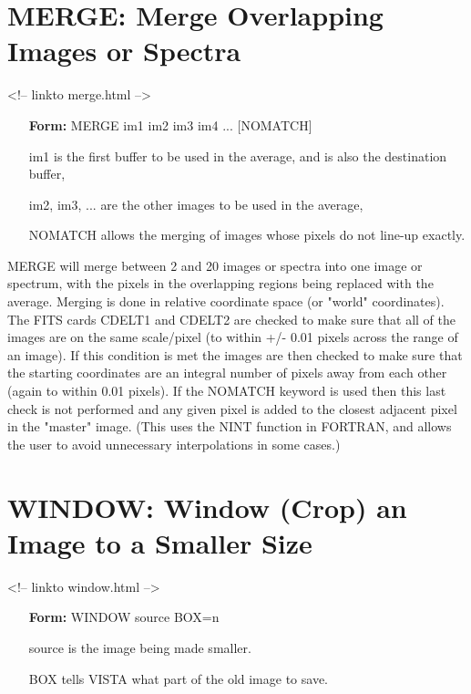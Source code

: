 \section{MERGE: Merge Overlapping Images or Spectra}
\begin{rawhtml}
<!-- linkto merge.html -->
\end{rawhtml}
\begin{itemize}
  \item[\textbf{Form: }MERGE im1 im2 im3 im4 ... {[NOMATCH]}\hfill]{}
  \item[im1]{is the first buffer to be used in the average,
       and is also the destination buffer,}
  \item[im2, im3, ...]{are the other images to be used in the average,}
  \item[NOMATCH]{allows the merging of images whose pixels do not
line-up exactly.}
\end{itemize}

MERGE will merge between 2 and 20 images or spectra into one image or
spectrum, with the pixels in the overlapping regions being replaced with
the average.  Merging is done in relative coordinate space (or "world"
coordinates). The FITS cards CDELT1 and CDELT2 are checked to make sure that
all of the images are on the same scale/pixel (to within +/- 0.01 pixels
across the range of an image).  If this condition is met the images are
then checked to make sure that the starting coordinates are an integral
number of pixels away from each other (again to within 0.01 pixels).  If
the NOMATCH keyword is used then this last check is not performed and any
given pixel is added to the closest adjacent pixel in the "master" image.
(This uses the NINT function in FORTRAN, and allows the user to avoid
unnecessary interpolations in some cases.)

\section{WINDOW: Window (Crop) an Image to a Smaller Size}
\begin{rawhtml}
<!-- linkto window.html -->
\end{rawhtml}
\begin{itemize}
  \item[\textbf{Form: }WINDOW source BOX=n\hfill]{}
  \item[source]{is the image being made smaller.}
  \item[BOX]{tells VISTA what part of the old image to save.}
\end{itemize}

